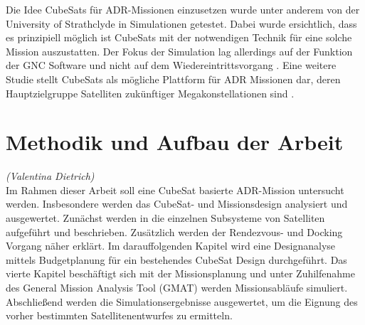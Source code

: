Die Idee CubeSats für ADR-Missionen einzusetzen wurde unter anderem von der University of Strathclyde in Simulationen getestet. Dabei wurde ersichtlich, dass es prinzipiell möglich ist CubeSats mit der notwendigen Technik für eine solche Mission auszustatten. Der Fokus der Simulation lag allerdings auf der Funktion der GNC Software und nicht auf dem Wiedereintrittsvorgang \cite{Pirat.2017}. Eine weitere Studie stellt CubeSats als mögliche Plattform für ADR Missionen dar, deren Hauptzielgruppe Satelliten zukünftiger Megakonstellationen sind \cite{BenLarbi.2017}.


	\section{Methodik und Aufbau der Arbeit}
		\hfill\emph{(Valentina Dietrich)}\\	
Im Rahmen dieser Arbeit soll eine  CubeSat basierte ADR-Mission untersucht werden. Insbesondere werden das CubeSat- und Missionsdesign analysiert und ausgewertet. Zunächst werden in  die einzelnen Subsysteme von Satelliten aufgeführt und beschrieben. Zusätzlich werden der Rendezvous- und Docking Vorgang näher erklärt. Im darauffolgenden Kapitel wird eine Designanalyse mittels Budgetplanung für ein bestehendes CubeSat Design durchgeführt.  Das vierte Kapitel beschäftigt sich mit der Missionsplanung und unter Zuhilfenahme des General Mission Analysis Tool (GMAT) werden Missionsabläufe simuliert. Abschließend werden die Simulationsergebnisse ausgewertet, um die Eignung des vorher bestimmten Satellitenentwurfes zu ermitteln.
